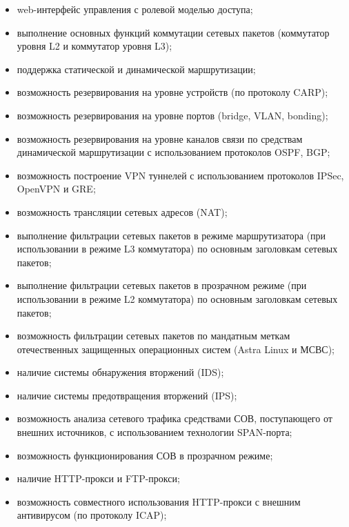 \begin{itemize}
	\item web-интерфейс управления с ролевой моделью доступа;
	
	\item выполнение основных функций коммутации сетевых пакетов (коммутатор уровня L2 и коммутатор уровня L3);
	
	\item поддержка статической и динамической маршрутизации;
	
	\item возможность резервирования на уровне устройств (по протоколу CARP);
	
	\item возможность резервирования на уровне портов (bridge, VLAN, bonding);
	
	\item возможность резервирования на уровне каналов связи по средствам динамической маршрутизации с использованием протоколов OSPF, BGP;
	
	\item возможность построение VPN туннелей с использованием протоколов IPSec, OpenVPN и GRE;
	
	\item возможность трансляции сетевых адресов (NAT);
	
	\item выполнение фильтрации сетевых пакетов в режиме маршрутизатора (при использовании в режиме L3 коммутатора) по основным заголовкам сетевых пакетов;
	
	\item выполнение фильтрации сетевых пакетов в прозрачном режиме (при использовании в режиме L2 коммутатора) по основным заголовкам сетевых пакетов;
	
	\item возможность фильтрации сетевых пакетов по мандатным меткам отечественных защищенных операционных систем (Astra Linux и МСВС);
	
	\item наличие системы обнаружения вторжений (IDS);
	
	\item наличие системы предотвращения вторжений (IPS);
	
	\item возможность анализа сетевого трафика средствами СОВ, поступающего от внешних источников, с использованием технологии SPAN-порта;
	
	\item возможность функционирования СОВ в прозрачном режиме;
	
	\item наличие HTTP-прокси и FTP-прокси;
	
	\item возможность совместного использования HTTP-прокси с внешним антивирусом (по протоколу ICAP);
\end{itemize}

